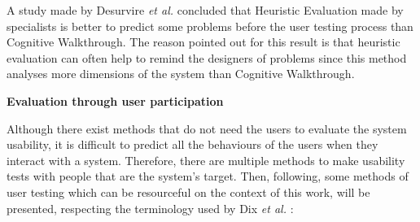A study made by Desurvire \textit{et al.} \cite{WhatIsGainedAndLostWhenUsingMethodsOtherThanEmpiricalTesting} concluded that Heuristic Evaluation made by specialists is better to predict some problems before the user testing process than Cognitive Walkthrough. The reason pointed out for this result is that heuristic evaluation can often help to remind the designers of problems since this method analyses more dimensions of the system than Cognitive Walkthrough.

\bigskip

\textbf{Evaluation through user participation}

Although there exist methods that do not need the users to evaluate the system usability, it is difficult to predict all the behaviours of the users when they interact with a system. Therefore, there are multiple methods to make usability tests with people that are the system's target. Then, following, some methods of user testing which can be resourceful on the context of this work, will be presented, respecting the terminology used by Dix \textit{et al.} \cite{humanComputerInteraction}:

